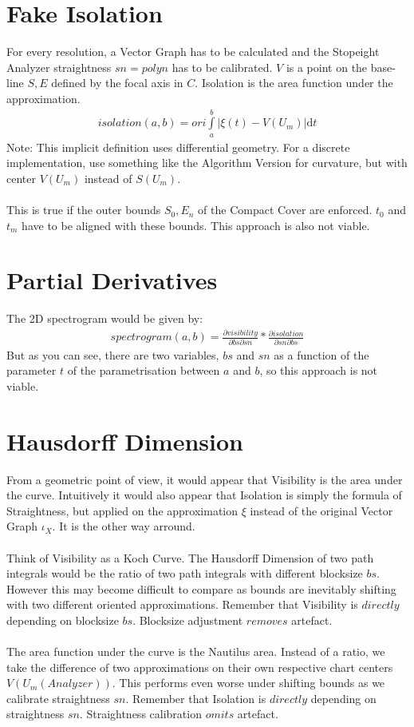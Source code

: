 \documentclass{report}
\begin{document}
\section{Fake Isolation}
For every resolution, a Vector Graph has to be calculated and the Stopeight Analyzer straightness $sn=polyn$ has to be calibrated. $V$ is a point on the base-line $S,E$ defined by the focal axis in $C$.
Isolation is the area function under the approximation.
\begin{align}
isolation(a,b)= ori \int \limits _{a}^{b} \vert \xi(t)-V(U_{m})\vert  \mathrm{d}t
\end{align}
Note: This implicit definition uses differential geometry. For a discrete implementation, use something like the Algorithm Version for curvature, but with center $V(U_{m})$ instead of $S(U_{m})$.\\\\
This is true if the outer bounds $S_{0},E_{n}$ of the Compact Cover are enforced. $t_{0}$ and $t_{m}$ have to be aligned with these bounds.
This approach is also not viable.

\section{Partial Derivatives}
The 2D spectrogram would be given by:
\begin{align}
spectrogram(a,b)=\frac{\partial visibility}{\partial bs \partial sn}*\frac{\partial isolation}{\partial sn \partial bs}
\end{align}
But as you can see, there are two variables, $bs$ and $sn$ as a function of the parameter $t$ of the parametrisation between $a$ and $b$, so this approach is not viable.

\section{Hausdorff Dimension}

From a geometric point of view, it would appear that Visibility is the area under the curve. Intuitively it would also appear that Isolation is simply the formula of Straightness, but applied on the approximation $\xi$ instead of the original Vector Graph $\iota_{X}$. It is the other way arround.\\\\
Think of Visibility as a Koch Curve. The Hausdorff Dimension of two path integrals would be the ratio of two path integrals with different blocksize $bs$. However this may become difficult to compare as bounds are inevitably shifting with two different oriented approximations. Remember that Visibility is $directly$ depending on blocksize $bs$. Blocksize adjustment $removes$ artefact.\\\\
The area function under the curve is the Nautilus area. Instead of a ratio, we take the difference of two approximations on their own respective chart centers $V(U_{m}(Analyzer))$. This performs even worse under shifting bounds as we calibrate straightness $sn$. Remember that Isolation is $directly$ depending on straightness $sn$. Straightness calibration $omits$ artefact.
\end{document}
